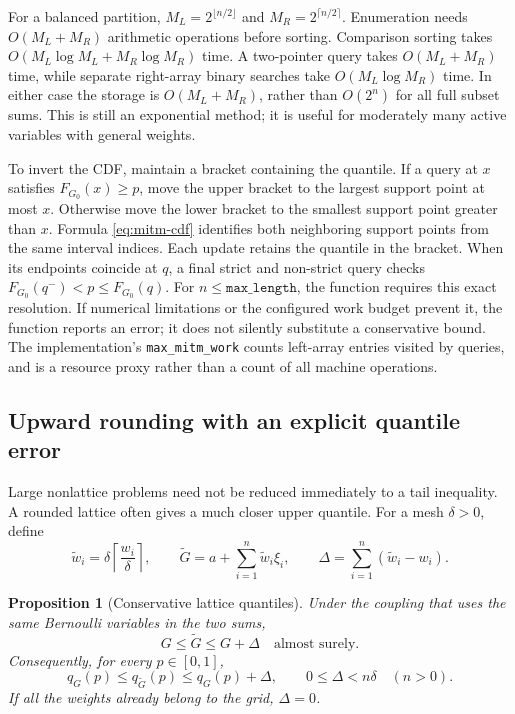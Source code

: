 \documentclass[11pt,letterpaper]{article}
\numberwithin{equation}{section}
\newtheorem{proposition}[theorem]{Proposition}
\theoremstyle{definition}
\theoremstyle{remark}
\begin{document}
For a balanced partition, $M_L=2^{\lfloor n/2\rfloor}$ and
$M_R=2^{\lceil n/2\rceil}$.  Enumeration needs $O(M_L+M_R)$ arithmetic
operations before sorting.  Comparison sorting takes
$O(M_L\log M_L+M_R\log M_R)$ time.  A two-pointer query takes
$O(M_L+M_R)$ time, while separate right-array binary searches take
$O(M_L\log M_R)$ time.  In either case the storage is
$O(M_L+M_R)$, rather than $O(2^n)$ for all full subset sums.  This is
still an exponential method; it is useful for moderately many active
variables with general weights.

To invert the CDF, maintain a bracket containing the quantile.  If a
query at $x$ satisfies $F_{G_0}(x)\ge p$, move the upper bracket to the
largest support point at most $x$.  Otherwise move the lower bracket to
the smallest support point greater than $x$.  Formula
\eqref{eq:mitm-cdf} identifies both neighboring support points from the
same interval indices.  Each update retains the quantile in the bracket.
When its endpoints coincide at $q$, a final strict and non-strict query
checks $F_{G_0}(q^-)<p\le F_{G_0}(q)$. For $n\le\texttt{max\_length}$,
the function requires this exact resolution. If numerical limitations or
the configured work budget prevent it, the function reports an error;
it does not silently substitute a conservative bound. The implementation's
\texttt{max\_mitm\_work} counts left-array entries visited by queries,
and is a resource proxy rather than a count of all machine operations.

\subsection{Upward rounding with an explicit quantile error}

Large nonlattice problems need not be reduced immediately to a tail
inequality.  A rounded lattice often gives a much closer upper quantile.
For a mesh $\delta>0$, define
\begin{equation}
 \widetilde w_i=\delta\left\lceil\frac{w_i}{\delta}\right\rceil,
 \qquad
 \widetilde G=a+\sum_{i=1}^n\widetilde w_i\xi_i,
 \qquad
 \Delta=\sum_{i=1}^n(\widetilde w_i-w_i).
 \label{eq:upward-grid}
\end{equation}

\begin{proposition}[Conservative lattice quantiles]
\label{prop:grid-quantile}
Under the coupling that uses the same Bernoulli variables in the two sums,
\[
 G\le\widetilde G\le G+\Delta\quad\text{almost surely}.
\]
Consequently, for every $p\in[0,1]$,
\begin{equation}
 q_G(p)\le q_{\widetilde G}(p)\le q_G(p)+\Delta,
 \qquad 0\le\Delta<n\delta \quad(n>0).
 \label{eq:grid-quantile-error}
\end{equation}
If all the weights already belong to the grid, $\Delta=0$.
\end{proposition}
\end{document}
